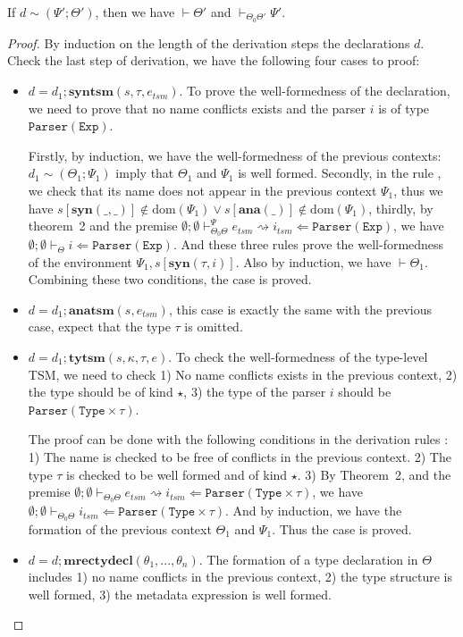 \documentclass{sig-alternate}
\begin{document}
\begin{lemma} If $d\sim(\Psi';\Theta')$, then we have $\vdash\Theta'$ and $\vdash_{\Theta_0\Theta'}\Psi'$.
\end{lemma}
\begin{proof}
By induction on the length of the derivation steps the declarations $d$. Check the last step of derivation, we have the following four cases to proof:
\begin{itemize}
\item $d=d_1;\mathbf{syntsm}(s,\tau,e_{tsm})$. To prove the well-formedness of the declaration, we need to prove that no name conflicts exists and the parser $i$ is of type $\mathtt{Parser}(\mathtt{Exp})$. 

Firstly, by induction, we have the well-formedness of the previous contexts: $d_1\sim(\Theta_1;\Psi_1)$ imply that $\Theta_1$ and $\Psi_1$ is well formed. Secondly, in the rule , we check that its name does not appear in the previous context $\Psi_1$, thus we have $s[\mathbf{syn}(\_,\_)]\notin\text{dom}(\Psi_1)\lor s[\mathbf{ana}(\_)]\notin\text{dom}(\Psi_1)$, thirdly, by theorem~2 and the premise $\emptyset;\emptyset\vdash_{\Theta_0\Theta}^{\Psi}e_{tsm}\rightsquigarrow i_{tsm} \Leftarrow \mathtt{Parser(Exp)}$, we have $\emptyset;\emptyset\vdash_{\Theta}i\Leftarrow\mathtt{Parser}(\mathtt{Exp})$. And these three rules prove the well-formedness of the environment $\Psi_1,s[\mathbf{syn}(\tau,i)]$. Also by induction, we have $\vdash\Theta_1$. Combining these two conditions, the case is proved.
\item $d=d_1;\mathbf{anatsm}(s,e_{tsm})$, this case is exactly the same with the previous case, expect that the type $\tau$ is omitted.
\item $d=d_1;\mathbf{tytsm}(s,\kappa,\tau,e)$. To check the well-formedness of the type-level TSM, we need to check 1) No name conflicts exists in the previous context, 2) the type should be of kind $\star$, 3) the type of the parser $i$ should be $\mathtt{Parser}(\mathtt{Type}\times\tau)$.

The proof can be done with the following conditions in the derivation rules : 1) The name is checked to be free of conflicts in the previous context. 2) The type $\tau$ is checked to be well formed and of kind $\star$. 3) By Theorem~2, and the premise $\emptyset;\emptyset\vdash_{\Theta_0\Theta}e_{tsm}\rightsquigarrow i_{tsm}\Leftarrow \mathtt{Parser}(\mathtt{Type}\times\tau)$, we have  $\emptyset;\emptyset\vdash_{\Theta_0\Theta} i_{tsm}\Leftarrow \mathtt{Parser}(\mathtt{Type}\times\tau)$. And by induction, we have the formation of the previous context $\Theta_1$ and $\Psi_1$. Thus the case is proved.
\item $d=d;\mathbf{mrectydecl}(\theta_1,...,\theta_n)$. The formation of a type declaration in $\Theta$ includes 1) no name conflicts in the previous context, 2) the type structure is well formed, 3) the metadata expression is well formed.


\end{itemize}
\end{proof}
\end{document}
